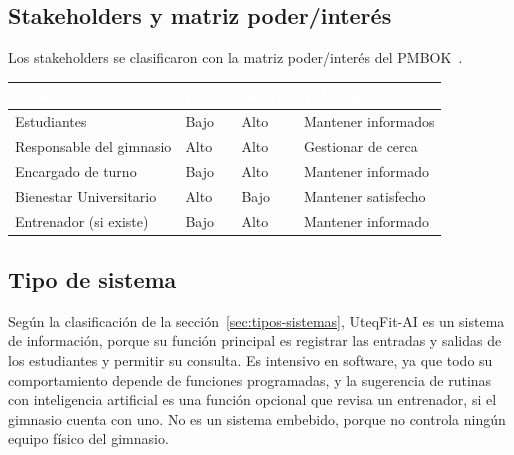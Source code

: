 \subsection{Stakeholders y matriz poder/interés}

Los stakeholders se clasificaron con la matriz poder/interés del PMBOK~\cite{pmbok7}.

\begin{center}
\small
\begin{tabularx}{\textwidth}{|>{\raggedright\arraybackslash}p{3.5cm}|>{\centering\arraybackslash}p{1.6cm}|>{\centering\arraybackslash}p{1.6cm}|L|}
\hline
{}\textcolor{white}{\textbf{Stakeholder}} & \textcolor{white}{\textbf{Poder}} & \textcolor{white}{\textbf{Interés}} & \textcolor{white}{\textbf{Estrategia}} \\ \hline
Estudiantes & Bajo & Alto & Mantener informados \\ \hline
Responsable del gimnasio & Alto & Alto & Gestionar de cerca \\ \hline
Encargado de turno & Bajo & Alto & Mantener informado \\ \hline
Bienestar Universitario & Alto & Bajo & Mantener satisfecho \\ \hline
Entrenador (si existe) & Bajo & Alto & Mantener informado \\ \hline
\end{tabularx}
\end{center}

\subsection{Tipo de sistema}

Según la clasificación de la sección~\ref{sec:tipos-sistemas}, UteqFit-AI es un sistema de información, porque su función principal es registrar las entradas y salidas de los estudiantes y permitir su consulta. Es intensivo en software, ya que todo su comportamiento depende de funciones programadas, y la sugerencia de rutinas con inteligencia artificial es una función opcional que revisa un entrenador, si el gimnasio cuenta con uno. No es un sistema embebido, porque no controla ningún equipo físico del gimnasio.
